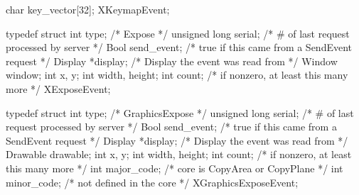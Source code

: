 \documentclass{report}
\begin{document}
\begin{itemize}
\begin{cppcode}
{                    char key_vector[32];
                } XKeymapEvent;
            \end{cppcode}
            \begin{cppcode}
                typedef struct {
                    int type;               /* Expose */
                    unsigned long serial;   /* # of last request processed by server */
                    Bool send_event;        /* true if this came from a SendEvent request */
                    Display *display;       /* Display the event was read from */
                    Window window;
                    int x, y;
                    int width, height;
                    int count;              /* if nonzero, at least this many more */
                } XExposeEvent;
            \end{cppcode}
            \begin{cppcode}
                typedef struct {
                    int type;               /* GraphicsExpose */
                    unsigned long serial;   /* # of last request processed by server */
                    Bool send_event;        /* true if this came from a SendEvent request */
                    Display *display;       /* Display the event was read from */
                    Drawable drawable;
                    int x, y;
                    int width, height;
                    int count;              /* if nonzero, at least this many more */
                    int major_code;         /* core is CopyArea or CopyPlane */
                    int minor_code;         /* not defined in the core */
                } XGraphicsExposeEvent;


\end{cppcode}
\end{itemize}
\end{document}
